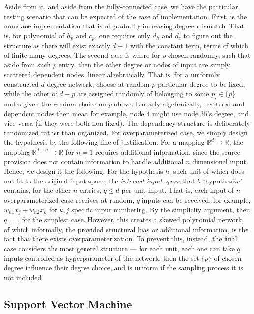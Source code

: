 \documentclass[10pt]{article} %
\begin{document}
Aside from it, and aside from the fully-connected case, we have the particular testing scenario that can be expected of the ease of implementation. First, is the mundane implementation that is of gradually increasing degree mismatch. That is, for polynomial of $h_{p}$ and $c_{p}$, one requires only $d_{h}$ and $d_{c}$ to figure out the structure as there will exist exactly $d+1$ with the constant term, terms of which of finite many degrees. The second case is where for $p$ chosen randomly, such that aside from such $p$ entry, then the other degree or nodes of input are simply scattered dependent nodes, linear algebraically. That is, for a uniformly constructed $d$-degree network, choose at random $p$ particular degree to be fixed, while the other of $d-p$ are assigned randomly of belonging to some $p_{i}\in \{p\}$ nodes given the random choice on $p$ above. Linearly algebraically, scattered and dependent nodes then mean for example, node $4$ might use node $35$'s degree, and vice versa (if they were both non-fixed). The dependency structure is deliberately randomized rather than organized. For overparameterized case, we simply design the hypothesis by the following line of justification. For a mapping $\mathbb{R}^{d}\to\mathbb{R}$, the mapping $\mathbb{R}^{d+n}\to \mathbb{R}$ for $n= 1$ requires additional information, since the source provision does not contain information to handle additional $n$ dimensional input. Hence, we design it the following. For the hypothesis $h$, such unit of which does not fit to the original input space, the \textit{internal input space} that $h$ `hypothesize' contains, for the other $n$ entries, $q\leq d$ per unit input. That is, each input of $n$ overparameterized case receives at random, $q$ inputs can be received, for example, $w_{n1}x_{j}+w_{n2}x_{k}$ for $k,j$ specific input numbering. By the simplicity argument, then $q=1$ for the simplest case. However, this creates a skewed polynomial network, of which informally, the provided structural bias or additional information, is the fact that there exists overparameterization. To prevent this, instead, the final case considers the most general structure --- for each unit, each one can take $q$ inputs controlled as hyperparameter of the network, then the set $\{p\}$ of chosen degree influence their degree choice, and is uniform if the sampling process it is not included. 

\clearpage

\subsection{Support Vector Machine}
\end{document}
